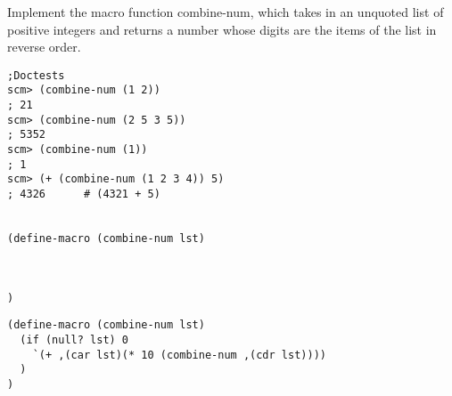 \begin{blocksection}
\question
Implement the macro function combine-num, which takes in an unquoted list of positive integers and returns a number whose digits are the items of the list in reverse order. 

\begin{lstlisting}
;Doctests
scm> (combine-num (1 2)) 
; 21
scm> (combine-num (2 5 3 5)) 
; 5352
scm> (combine-num (1)) 
; 1
scm> (+ (combine-num (1 2 3 4)) 5)
; 4326      # (4321 + 5)


(define-macro (combine-num lst) 



)

\end{lstlisting}
\end{blocksection}

\begin{solution}
\begin{blocksection}
\begin{lstlisting}
(define-macro (combine-num lst) 
  (if (null? lst) 0 
    `(+ ,(car lst)(* 10 (combine-num ,(cdr lst))))
  )
)

\end{lstlisting}
\end{blocksection}
\end{solution}
